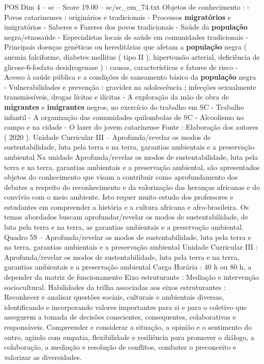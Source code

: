 \begin{textsample}{POS Dim 4 – sc – Score 19.00 – sc/sc\_em\_74.txt}
Objetos de conhecimento : - Povos catarinenses : originários e tradicionais - Processos \textbf{migratórios} e imigratórios - Saberes e Fazeres dos povos tradicionais - Saúde da \textbf{população} negra/etnosaúde - Especialistas locais de saúde em comunidades tradicionais - Principais doenças genéticas ou hereditárias que afetam a \textbf{população} negra ( anemia falciforme, diabetes mellitus ( tipo II ), hipertensão arterial, deficiência de glicose-6-fosfato desidrogenase ) : causas, características e fatores de risco - Acesso à saúde pública e a condições de saneamento básico da \textbf{população} negra - Vulnerabilidades e prevenção : gravidez na adolescência ; infecções sexualmente transmissíveis, drogas lícitas e ilícitas - A exploração da mão de obra de \textbf{migrantes} e \textbf{imigrantes} negros, no exercício do trabalho em SC - Trabalho infantil - A organização das comunidades quilombolas de SC - Alcoolismo no campo e na cidade - O lazer do jovem catarinense Fonte : Elaboração dos autores ( 2020 ).
Unidade Curricular III – Aprofunda/revelar os modos de sustentabilidade, luta pela terra e na terra, garantias ambientais e a preservação ambiental Na unidade Aprofunda/revelar os modos de sustentabilidade, luta pela terra e na terra, garantias ambientais e a preservação ambiental, são apresentados objetos do conhecimento que visam a contribuir como aprofundamento dos debates a respeito do reconhecimento e da valorização das heranças africanas e do convívio com o meio ambiente.
Isto requer muito estudo dos professores e estudantes em compreender a história e a cultura africana e afro-brasileira.
Os temas abordados buscam aprofundar/revelar os modos de sustentabilidade, de luta pela terra e na terra, as garantias ambientais e a preservação ambiental.
Quadro 59 – Aprofunda/revelar os modos de sustentabilidade, luta pela terra e na terra, garantias ambientais e a preservação ambiental Unidade Curricular III : Aprofunda/revelar os modos de sustentabilidade, luta pela terra e na terra, garantias ambientais e a preservação ambiental Carga Horária : 40 h ou 80 h, a depender da matriz de funcionamento Eixo estruturante : Mediação e intervenção sociocultural.
Habilidades da trilha associadas aos eixos estruturantes : Reconhecer e analisar questões sociais, culturais e ambientais diversas, identificando e incorporando valores importantes para si e para o coletivo que assegurem a tomada de decisões conscientes, consequentes, colaborativas e responsáveis.
Compreender e considerar a situação, a opinião e o sentimento do outro, agindo com empatia, flexibilidade e resiliência para promover o diálogo, a colaboração, a mediação e resolução de conflitos, combater o preconceito e valorizar as diversidades.

\end{textsample}
